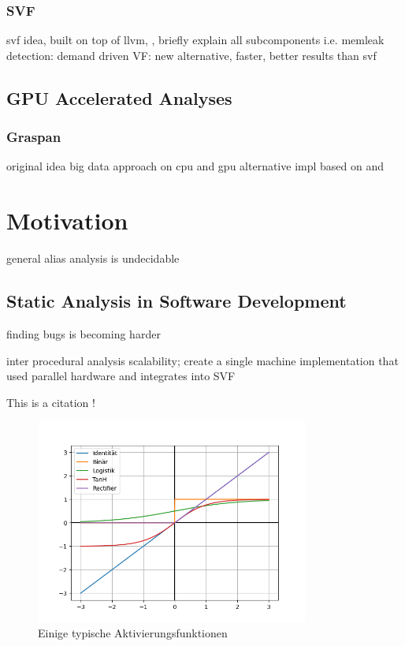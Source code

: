 \subsubsection{SVF}
svf idea, built on top of llvm, \autocite{sui2016svf}, briefly explain all subcomponents i.e. memleak detection: \autocite{sui2014detecting} demand driven VF: \autocite{sui2018value} new alternative, faster, better results than svf \autocite{shi2018pinpoint}
\subsection{GPU Accelerated Analyses}
\subsubsection{Graspan}
original idea \autocite{zheng2008demand} big data approach on cpu \autocite{wang2017graspan} and gpu \autocite{zuo2021systemizing} alternative impl \autocite{gu2020towards} based on \autocite{mendez2012gpu} and \autocite{mendez2010parallel}
\section{Motivation}
general alias analysis is undecidable
\subsection{Static Analysis in Software Development}
finding bugs is becoming harder

inter procedural analysis scalability; create a single machine implementation that used parallel hardware and integrates into SVF


This is a citation \autocite{juliani2018unity}!
\begin{figure}
    \centering
    \includegraphics[width=0.8\textwidth]{img/test.png}
    \caption{Einige typische Aktivierungsfunktionen}
    \label{fig:actfn}
\end{figure}

